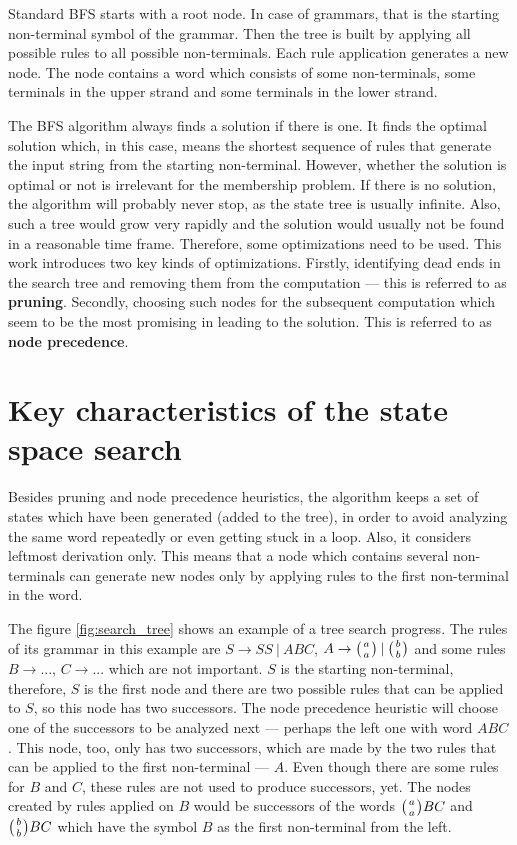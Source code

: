 Standard BFS starts with a root node. In case of grammars, that is the starting non-terminal symbol of the grammar. Then the tree is built by applying all possible rules to all possible non-terminals. Each rule application generates a new node. The node contains a word which consists of some non-terminals, some terminals in the upper strand and some terminals in the lower strand.

The BFS algorithm always finds a solution if there is one. It finds the optimal solution which, in this case, means the shortest sequence of rules that generate the input string from the starting non-terminal. However, whether the solution is optimal or not is irrelevant for the membership problem. If there is no solution, the algorithm will probably never stop, as the state tree is usually infinite. Also, such a tree would grow very rapidly and the solution would usually not be found in a reasonable time frame. Therefore, some optimizations need to be used. This work introduces two key kinds of optimizations. Firstly, identifying dead ends in the search tree and removing them from the computation --- this is referred to as \textbf{pruning}. Secondly, choosing such nodes for the subsequent computation which seem to be the most promising in leading to the solution. This is referred to as \textbf{node precedence}.

\section{Key characteristics of the state space search}
Besides pruning and node precedence heuristics, the algorithm keeps a set of states which have been generated (added to the tree), in order to avoid analyzing the same word repeatedly or even getting stuck in a loop. Also, it considers leftmost derivation only. This means that a node which contains several non-terminals can generate new nodes only by applying rules to the first non-terminal in the word.

The figure \ref{fig:search_tree} shows an example of a tree search progress. The rules of its grammar in this example are $S \rightarrow S S \:|\: A B C$, $A \rightarrow \wkpair{a}{a} \:|\: \wkpair{b}{b}$ and some rules $B \rightarrow ...$, $C \rightarrow ...$ which are not important. $S$ is the starting non-terminal, therefore, $S$ is the first node and there are two possible rules that can be applied to $S$, so this node has two successors. The node precedence heuristic will choose one of the successors to be analyzed next --- perhaps the left one with word $A B C$. This node, too, only has two successors, which are made by the two rules that can be applied to the first non-terminal --- $A$. Even though there are some rules for $B$ and $C$, these rules are not used to produce successors, yet. The nodes created by rules applied on $B$ would be successors of the words $\wkpair{a}{a} B C$ and $\wkpair{b}{b} B C$ which have the symbol $B$ as the first non-terminal from the left.

